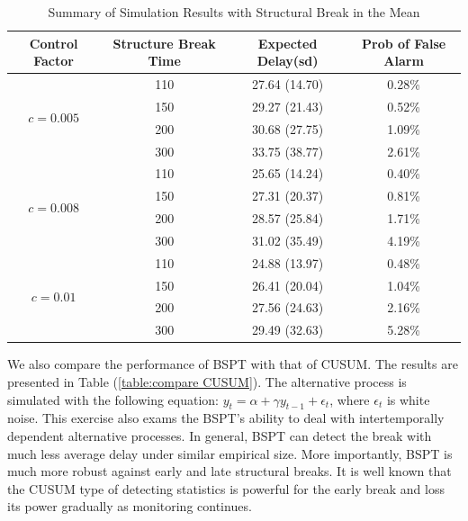 \documentclass[preprint,authoryear,12pt,english]{elsarticle}
\theoremstyle{plain}
\begin{document}
\begin{table}[H]
    \footnotesize
    \centering
    \begin{tabular}{c c c c }
        \hline
        \hline
        Control Factor             & Structure Break Time & Expected Delay(sd) & Prob of False Alarm \\
        \hline
        \multirow{4}{*}{$c=0.005$} & 110                  & 27.64 (14.70)      & 0.28\%              \\
                                   & 150                  & 29.27 (21.43)      & 0.52\%              \\
                                   & 200                  & 30.68 (27.75)      & 1.09\%              \\
                                   & 300                  & 33.75 (38.77)      & 2.61\%              \\
        \hline
        \multirow{4}{*}{$c=0.008$} & 110                  & 25.65 (14.24)      & 0.40\%              \\
                                   & 150                  & 27.31 (20.37)      & 0.81\%              \\
                                   & 200                  & 28.57 (25.84)      & 1.71\%              \\
                                   & 300                  & 31.02 (35.49)      & 4.19\%              \\
        \hline
        \multirow{4}{*}{$c=0.01$}  & 110                  & 24.88 (13.97)      & 0.48\%              \\
                                   & 150                  & 26.41 (20.04)      & 1.04\%              \\
                                   & 200                  & 27.56 (24.63)      & 2.16\%              \\
                                   & 300                  & 29.49 (32.63)      & 5.28\%              \\
        \hline
        \hline
    \end{tabular}
    \protect\caption{Summary of Simulation Results with Structural Break in the Mean}
    \label{table:simulation_mu}
\end{table}
We also compare the performance of BSPT with that of CUSUM. The results are presented in Table (\ref{table:compare CUSUM}). The alternative process is simulated with the following equation: $y_{t}=\alpha+\gamma y_{t-1}+\epsilon_{t}$, where $\epsilon_{t}$ is white noise. This exercise also exams the BSPT's ability to deal with intertemporally dependent alternative processes. In general, BSPT can detect the break with much less average delay under similar empirical size. More importantly, BSPT is much more robust against early and late structural breaks. It is well known that the CUSUM type of detecting statistics is powerful for the early break and loss its power gradually as monitoring continues.
\end{document}
